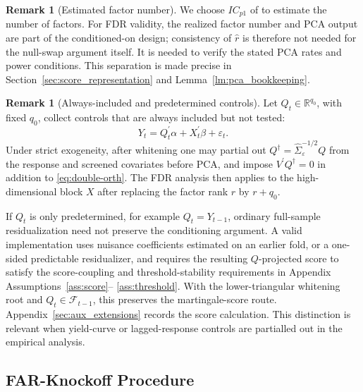 ﻿\documentclass[12pt]{article}
\newcommand{\0}{\mbox{\bf 0}}
\theoremstyle{plain}%
\newtheorem{remark}{Remark}
\theoremstyle{definition}
\newtheorem{remark}[theorem]{Remark}
\begin{document}
{{\color{red}
\begin{remark}[Estimated factor number]
\label{rem:factor_number_main}
We choose $IC_{p1}$ of \citet{BaiNg2002} to estimate the number of factors.
For FDR validity, the realized factor number and PCA output are part of the
conditioned-on design; consistency of $\widehat r$ is therefore not needed
for the null-swap argument itself.  It is needed to verify the stated PCA
rates and power conditions.  This separation is made precise in
Section~\ref{sec:score_representation} and
Lemma~\ref{lm:pca_bookkeeping}.
\end{remark}

\begin{remark}[Always-included and predetermined controls]
\label{rem:Qt_main}
Let $Q_t\in\mathbb R^{q_0}$, with fixed $q_0$, collect controls that are
always included but not tested:
\[
Y_t=Q_t^\prime\alpha+X_t^\prime\beta+\varepsilon_t.
\]
Under strict exogeneity, after whitening one may partial out
$Q^\dagger=\widehat\Sigma_\varepsilon^{-1/2}Q$ from the response and
screened covariates before PCA, and impose
$V^\prime Q^\dagger=0$ in addition to
\eqref{eq:double-orth}.  The FDR analysis then applies to the
high-dimensional block $X$ after replacing the factor rank $r$ by
$r+q_0$.

If $Q_t$ is only predetermined, for example $Q_t=Y_{t-1}$, ordinary
full-sample residualization need not preserve the conditioning argument.
A valid implementation uses nuisance coefficients estimated on an earlier
fold, or a one-sided predictable residualizer, and requires the resulting
$Q$-projected score to satisfy the score-coupling and threshold-stability
requirements in Appendix Assumptions~\ref{ass:score}--%
\ref{ass:threshold}.  With the lower-triangular whitening root and
$Q_t\in\mathcal F_{t-1}$, this preserves the martingale-score route.
Appendix~\ref{sec:aux_extensions} records the score calculation.  This
distinction is relevant when yield-curve or lagged-response controls are
partialled out in the empirical analysis.
\end{remark}
}



\subsection{FAR-Knockoff Procedure}
\label{sec:FAR-Knockoff_procedure}

}
\end{document}
